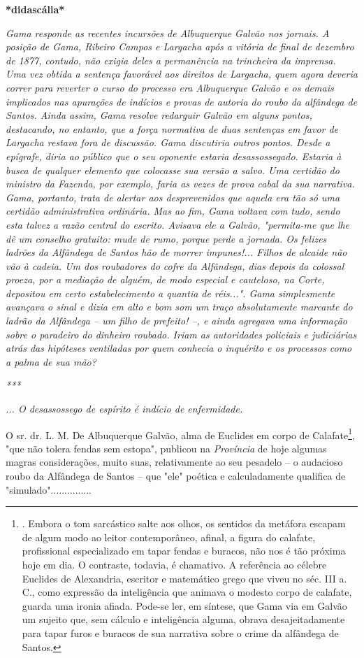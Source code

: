 \textbf{*didascália*}

\emph{Gama responde as recentes incursões de Albuquerque Galvão nos
jornais. A posição de Gama, Ribeiro Campos e Largacha após a vitória de
final de dezembro de 1877, contudo, não exigia deles a permanência na
trincheira da imprensa. Uma vez obtida a sentença favorável aos direitos
de Largacha, quem agora deveria correr para reverter o curso do processo
era Albuquerque Galvão e os demais implicados nas apurações de indícios
e provas de autoria do roubo da alfândega de Santos. Ainda assim, Gama
resolve redarguir Galvão em alguns pontos, destacando, no entanto, que a
força normativa de duas sentenças em favor de Largacha restava fora de
discussão. Gama discutiria outros pontos. Desde a epígrafe, diria ao
público que o seu oponente estaria desassossegado. Estaria à busca de
qualquer elemento que colocasse sua versão a salvo. Uma certidão do
ministro da Fazenda, por exemplo, faria as vezes de prova cabal da sua
narrativa. Gama, portanto, trata de alertar aos desprevenidos que aquela
era tão só uma certidão administrativa ordinária. Mas ao fim, Gama
voltava com tudo, sendo esta talvez a razão central do escrito. Avisava
ele a Galvão, "permita-me que lhe dê um conselho gratuito: mude de rumo,
porque perde a jornada. Os felizes ladrões da Alfândega de Santos hão de
morrer impunes!... Filhos de alcaide não vão à cadeia. Um dos roubadores
do cofre da Alfândega, dias depois da colossal proeza, por a mediação de
alguém, de modo especial e cauteloso, na Corte, depositou em certo
estabelecimento a quantia de réis...". Gama simplesmente avançava o
sinal e dizia em alto e bom som um traço absolutamente marcante do
ladrão da Alfândega -- um filho de prefeito! --, e ainda agregava uma
informação sobre o paradeiro do dinheiro roubado. Iriam as autoridades
policiais e judiciárias atrás das hipóteses ventiladas por quem conhecia
o inquérito e os processos como a palma de sua mão?}

\emph{***}

\emph{... O desassossego de espírito é indício de enfermidade.}

O sr. dr. L. M. De Albuquerque Galvão, alma de Euclides em corpo de
Calafate\footnote{. Embora o tom sarcástico salte aos olhos, os sentidos
  da metáfora escapam de algum modo ao leitor contemporâneo, afinal, a
  figura do calafate, profissional especializado em tapar fendas e
  buracos, não nos é tão próxima hoje em dia. O contraste, todavia, é
  chamativo. A referência ao célebre Euclides de Alexandria, escritor e
  matemático grego que viveu no séc. III a. C., como expressão da
  inteligência que animava o modesto corpo de calafate, guarda uma
  ironia afiada. Pode-se ler, em síntese, que Gama via em Galvão um
  sujeito que, sem cálculo e inteligência alguma, obrava
  desajeitadamente para tapar furos e buracos de sua narrativa sobre o
  crime da alfândega de Santos.}, "que não tolera fendas sem estopa",
publicou na \emph{Província} de hoje algumas magras considerações, muito
suas, relativamente ao seu pesadelo -- o audacioso roubo da Alfândega de
Santos -- que "ele" poética e calculadamente qualifica de
"simulado"...............

